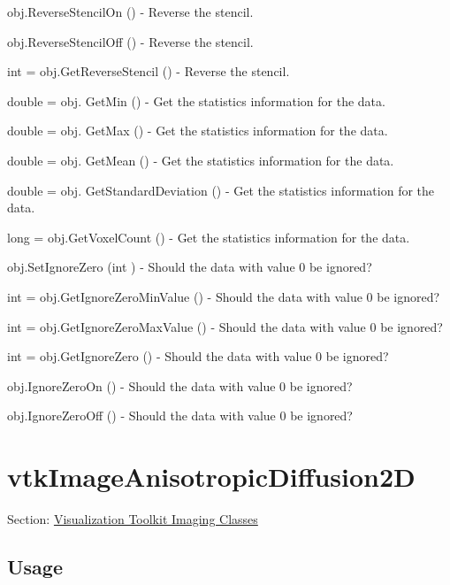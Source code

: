 \begin{DoxyItemize}
\item {\ttfamily obj.\-Reverse\-Stencil\-On ()} -\/ Reverse the stencil.  
\item {\ttfamily obj.\-Reverse\-Stencil\-Off ()} -\/ Reverse the stencil.  
\item {\ttfamily int = obj.\-Get\-Reverse\-Stencil ()} -\/ Reverse the stencil.  
\item {\ttfamily double = obj. Get\-Min ()} -\/ Get the statistics information for the data.  
\item {\ttfamily double = obj. Get\-Max ()} -\/ Get the statistics information for the data.  
\item {\ttfamily double = obj. Get\-Mean ()} -\/ Get the statistics information for the data.  
\item {\ttfamily double = obj. Get\-Standard\-Deviation ()} -\/ Get the statistics information for the data.  
\item {\ttfamily long = obj.\-Get\-Voxel\-Count ()} -\/ Get the statistics information for the data.  
\item {\ttfamily obj.\-Set\-Ignore\-Zero (int )} -\/ Should the data with value 0 be ignored?  
\item {\ttfamily int = obj.\-Get\-Ignore\-Zero\-Min\-Value ()} -\/ Should the data with value 0 be ignored?  
\item {\ttfamily int = obj.\-Get\-Ignore\-Zero\-Max\-Value ()} -\/ Should the data with value 0 be ignored?  
\item {\ttfamily int = obj.\-Get\-Ignore\-Zero ()} -\/ Should the data with value 0 be ignored?  
\item {\ttfamily obj.\-Ignore\-Zero\-On ()} -\/ Should the data with value 0 be ignored?  
\item {\ttfamily obj.\-Ignore\-Zero\-Off ()} -\/ Should the data with value 0 be ignored?  
\end{DoxyItemize}\hypertarget{vtkimaging_vtkimageanisotropicdiffusion2d}{}\section{vtk\-Image\-Anisotropic\-Diffusion2\-D}\label{vtkimaging_vtkimageanisotropicdiffusion2d}
Section\-: \hyperlink{sec_vtkimaging}{Visualization Toolkit Imaging Classes} \hypertarget{vtkwidgets_vtkxyplotwidget_Usage}{}\subsection{Usage}\label{vtkwidgets_vtkxyplotwidget_Usage}
